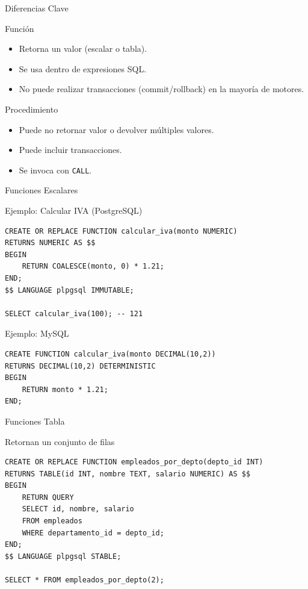\documentclass[aspectratio=169, 10pt, xcolor=table]{beamer}
\begin{document}
\begin{frame}{Diferencias Clave}
    \begin{block}{Función}
        \begin{itemize}
            \item Retorna un valor (escalar o tabla).
            \item Se usa dentro de expresiones SQL.
            \item No puede realizar transacciones (commit/rollback) en la mayoría de motores.
        \end{itemize}
    \end{block}
    \begin{block}{Procedimiento}
        \begin{itemize}
            \item Puede no retornar valor o devolver múltiples valores.
            \item Puede incluir transacciones.
            \item Se invoca con \texttt{CALL}.
        \end{itemize}
    \end{block}
\end{frame}

\begin{frame}[fragile]{Funciones Escalares}
    \begin{exampleblock}{Ejemplo: Calcular IVA (PostgreSQL)}
        \begin{lstlisting}
CREATE OR REPLACE FUNCTION calcular_iva(monto NUMERIC)
RETURNS NUMERIC AS $$
BEGIN
    RETURN COALESCE(monto, 0) * 1.21;
END;
$$ LANGUAGE plpgsql IMMUTABLE;

SELECT calcular_iva(100); -- 121
        \end{lstlisting}
    \end{exampleblock}
    \begin{exampleblock}{Ejemplo: MySQL}
        \begin{lstlisting}
CREATE FUNCTION calcular_iva(monto DECIMAL(10,2))
RETURNS DECIMAL(10,2) DETERMINISTIC
BEGIN
    RETURN monto * 1.21;
END;
        \end{lstlisting}
    \end{exampleblock}
\end{frame}

\begin{frame}[fragile]{Funciones Tabla}
    \begin{block}{Retornan un conjunto de filas}
        \begin{lstlisting}
CREATE OR REPLACE FUNCTION empleados_por_depto(depto_id INT)
RETURNS TABLE(id INT, nombre TEXT, salario NUMERIC) AS $$
BEGIN
    RETURN QUERY
    SELECT id, nombre, salario
    FROM empleados
    WHERE departamento_id = depto_id;
END;
$$ LANGUAGE plpgsql STABLE;

SELECT * FROM empleados_por_depto(2);
        \end{lstlisting}
    \end{block}
\end{frame}
\end{document}
